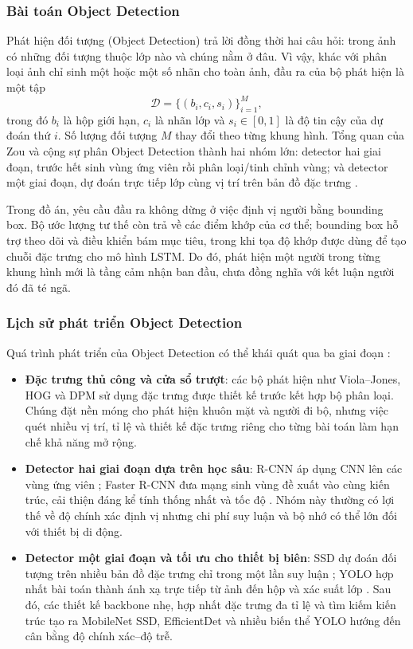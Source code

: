 \subsubsection{Bài toán Object Detection}

Phát hiện đối tượng (Object Detection) trả lời đồng thời hai câu hỏi: trong ảnh có những đối tượng thuộc lớp nào và chúng nằm ở đâu. Vì vậy, khác với phân loại ảnh chỉ sinh một hoặc một số nhãn cho toàn ảnh, đầu ra của bộ phát hiện là một tập
\begin{equation}
\mathcal{D}=\{(b_i,c_i,s_i)\}_{i=1}^{M},
\end{equation}
trong đó $b_i$ là hộp giới hạn, $c_i$ là nhãn lớp và $s_i\in[0,1]$ là độ tin cậy của dự đoán thứ $i$. Số lượng đối tượng $M$ thay đổi theo từng khung hình. Tổng quan của Zou và cộng sự phân Object Detection thành hai nhóm lớn: detector hai giai đoạn, trước hết sinh vùng ứng viên rồi phân loại/tinh chỉnh vùng; và detector một giai đoạn, dự đoán trực tiếp lớp cùng vị trí trên bản đồ đặc trưng .

Trong đồ án, yêu cầu đầu ra không dừng ở việc định vị người bằng bounding box. Bộ ước lượng tư thế còn trả về các điểm khớp của cơ thể; bounding box hỗ trợ theo dõi và điều khiển bám mục tiêu, trong khi tọa độ khớp được dùng để tạo chuỗi đặc trưng cho mô hình LSTM. Do đó, phát hiện một người trong từng khung hình mới là tầng cảm nhận ban đầu, chưa đồng nghĩa với kết luận người đó đã té ngã.

\subsubsection{Lịch sử phát triển Object Detection}

Quá trình phát triển của Object Detection có thể khái quát qua ba giai đoạn :

\begin{itemize}
    \item \textbf{Đặc trưng thủ công và cửa sổ trượt}: các bộ phát hiện như Viola--Jones, HOG và DPM sử dụng đặc trưng được thiết kế trước kết hợp bộ phân loại. Chúng đặt nền móng cho phát hiện khuôn mặt và người đi bộ, nhưng việc quét nhiều vị trí, tỉ lệ và thiết kế đặc trưng riêng cho từng bài toán làm hạn chế khả năng mở rộng.
    \item \textbf{Detector hai giai đoạn dựa trên học sâu}: R-CNN áp dụng CNN lên các vùng ứng viên ; Faster R-CNN đưa mạng sinh vùng đề xuất vào cùng kiến trúc, cải thiện đáng kể tính thống nhất và tốc độ . Nhóm này thường có lợi thế về độ chính xác định vị nhưng chi phí suy luận và bộ nhớ có thể lớn đối với thiết bị di động.
    \item \textbf{Detector một giai đoạn và tối ưu cho thiết bị biên}: SSD dự đoán đối tượng trên nhiều bản đồ đặc trưng chỉ trong một lần suy luận ; YOLO hợp nhất bài toán thành ánh xạ trực tiếp từ ảnh đến hộp và xác suất lớp . Sau đó, các thiết kế backbone nhẹ, hợp nhất đặc trưng đa tỉ lệ và tìm kiếm kiến trúc tạo ra MobileNet SSD, EfficientDet và nhiều biến thể YOLO hướng đến cân bằng độ chính xác--độ trễ.
\end{itemize}

